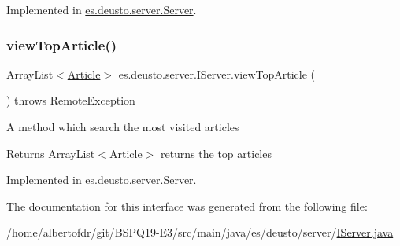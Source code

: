 Implemented in \hyperlink{classes_1_1deusto_1_1server_1_1_server_ab2729689bb71bd707881b563cdf2a006}{es.\+deusto.\+server.\+Server}.

\mbox{\label{interfacees_1_1deusto_1_1server_1_1_i_server_ab1b33472017b55ae84bf849430db5f1b}} 
\subsubsection{\texorpdfstring{view\+Top\+Article()}{viewTopArticle()}}
{\footnotesize\ttfamily Array\+List$<$\hyperlink{classes_1_1deusto_1_1server_1_1jdo_1_1_article}{Article}$>$ es.\+deusto.\+server.\+I\+Server.\+view\+Top\+Article (\begin{DoxyParamCaption}{ }\end{DoxyParamCaption}) throws Remote\+Exception}

A method which search the most visited articles \begin{DoxyReturn}{Returns}
Array\+List$<$\+Article$>$ returns the top articles 
\end{DoxyReturn}


Implemented in \hyperlink{classes_1_1deusto_1_1server_1_1_server_ada6d55bcd79444de821eaeb6b21c44b8}{es.\+deusto.\+server.\+Server}.



The documentation for this interface was generated from the following file\+:\begin{DoxyCompactItemize}
\item 
/home/albertofdr/git/\+B\+S\+P\+Q19-\/\+E3/src/main/java/es/deusto/server/\hyperlink{_i_server_8java}{I\+Server.\+java}\end{DoxyCompactItemize}
